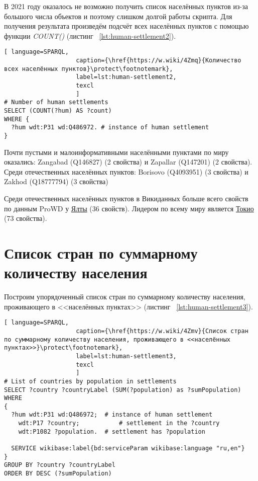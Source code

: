 В 2021 году оказалось не возможно получить список населённых пунктов из-за большого числа объектов и поэтому слишком долгой работы скрипта. Для получения результата произведём подсчёт всех населённых пунктов с помощью функции \textit{COUNT()} (листинг ~\protect\ref{lst:human-settlement2}).

\begin{lstlisting}[ language=SPARQL, 
                    caption={\href{https://w.wiki/4Zmq}{Количество всех населённых пунктов}\protect\footnotemark},
                    label=lst:human-settlement2,
                    texcl 
                    ]
# Number of human settlements
SELECT (COUNT(?hum) AS ?count) 
WHERE {
  ?hum wdt:P31 wd:Q486972. # instance of human settlement  
}
\end{lstlisting}%

Почти пустыми и малоинформативными населёнными пунктами по миру оказались: Zangabad (Q146827) (2 свойства) и Zapallar (Q147201) (2 свойства). Среди отечественных населённых пунктов: Borisovo (Q4093951) (3 свойства) и Zakhod (Q18777794) (3 свойства)

Среди отечественных населённых пунктов в Викиданных больше всего свойств по данным ProWD у \href{http://www.wikidata.org/entity/Q128499}{Ялты} (\num{36} свойств). Лидером по всему миру является \href{http://www.wikidata.org/entity/Q1490}{Токио} (\num{73} свойства). \protect\footnotemark



\section{Список стран по суммарному количеству населения}

Построим упорядоченный список стран по суммарному количеству населения, проживающего в <<населённых пунктах>> (листинг ~\protect\ref{lst:human-settlement3}).

\begin{lstlisting}[ language=SPARQL, 
                    caption={\href{https://w.wiki/4Zmv}{Список стран по суммарному количеству населения, проживающего в <<населённых пунктах>>}\protect\footnotemark},
                    label=lst:human-settlement3,
                    texcl 
                    ]
# List of countries by population in settlements
SELECT ?country ?countryLabel (SUM(?population) as ?sumPopulation)
WHERE
{
  ?hum wdt:P31 wd:Q486972; 	# instance of human settlement
    wdt:P17 ?country;   		# settlement in the ?country
    wdt:P1082 ?population. 	# settlement has ?population
  
  SERVICE wikibase:label{bd:serviceParam wikibase:language "ru,en"}
}
GROUP BY ?country ?countryLabel 
ORDER BY DESC (?sumPopulation)
\end{lstlisting}%

